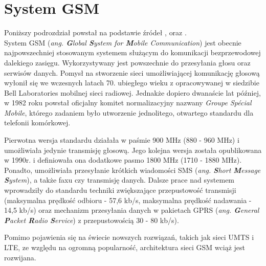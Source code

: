 \section{System GSM}
\label{GSM}

Poniższy podrozdział powstał na podstawie źródeł \cite{GSM}, \cite{GSM_tutorialspoint} oraz \cite{GSM_wiki}.\\

System GSM (\textit{ang. \textbf{G}lobal \textbf{S}ystem for \textbf{M}obile Communication}) jest obecnie najpowszechniej stosowanym systemem służącym do komunikacji bezprzewodowej dalekiego zasięgu. Wykorzystywany jest powszechnie do przesyłania głosu oraz serwisów danych. Pomysł na stworzenie sieci umożliwiającej komunikację głosową wyłonił się we wczesnych latach 70. ubiegłego wieku z opracowywanej w siedzibie Bell Laboratories mobilnej sieci radiowej. Jednakże dopiero dwanaście lat później, w 1982 roku powstał oficjalny komitet normalizacyjny nazwany \textit{Groupe Spécial Mobile}, którego zadaniem było utworzenie jednolitego, otwartego standardu dla telefonii komórkowej. 

Pierwotna wersja standardu działała w paśmie 900 MHz (880 - 960 MHz) i umożliwiała jedynie transmisję głosową. Jego kolejna wersja została opublikowana w 1990r. i definiowała ona dodatkowe pasmo 1800 MHz (1710 - 1880 MHz). Ponadto, umożliwiała przesyłanie krótkich wiadomości SMS (\textit{ang. \textbf{S}hort \textbf{M}essage \textbf{S}ystem}), a także faxu czy transmisję danych. Dalsze prace nad systemem wprowadziły do standardu techniki zwiększające przepustowość transmisji (maksymalna prędkość odbioru - 57,6 kb/s, maksymalna prędkość nadawania - 14,5 kb/s) oraz mechanizm przesyłania danych w pakietach GPRS (\textit{ang. \textbf{G}eneral \textbf{P}acket \textbf{R}adio \textbf{S}ervice}) z przepustowością 30 - 80 kb/s). 

Pomimo pojawienia się na świecie nowszych rozwiązań, takich jak sieci UMTS i LTE, ze względu na ogromną popularność, architektura sieci GSM wciąż jest rozwijana. 

